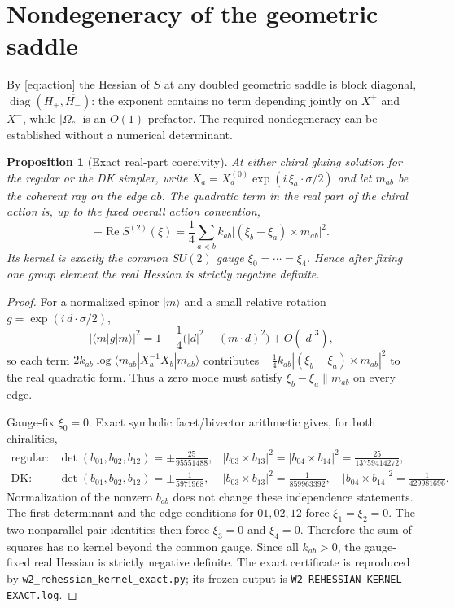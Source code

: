 \documentclass[11pt]{article}
\numberwithin{equation}{section}
\newtheorem{proposition}[theorem]{Proposition}
\theoremstyle{definition}
\theoremstyle{remark}
\newcommand{\SUtwo}{SU(2)}
\renewcommand{\Re}{\operatorname{Re}}
\begin{document}
\section{Nondegeneracy of the geometric saddle}\label{sec:s4}

By \eqref{eq:action} the Hessian of $S$ at any doubled geometric saddle is
block diagonal,
$\operatorname{diag}(H_+,\overline{H_-})$: the exponent contains no term
depending jointly on $X^+$ and $X^-$, while $|\Omega_c|$ is an $O(1)$
prefactor. The required nondegeneracy can be established without a numerical
determinant.

\begin{proposition}[Exact real-part coercivity]\label{prop:redef}
At either chiral gluing solution for the regular or the DK simplex, write
$X_a=X_a^{(0)}\exp(i\,\xi_a\!\cdot\!\sigma/2)$ and let $m_{ab}$ be the coherent
ray on the edge $ab$. The quadratic term in the real part of the chiral action
is, up to the fixed overall action convention,
\[
 -\Re S^{(2)}(\xi)
 =\frac14\sum_{a<b}k_{ab}
   \bigl|(\xi_b-\xi_a)\times m_{ab}\bigr|^2 .
\]
Its kernel is exactly the common $\SUtwo$ gauge
$\xi_0=\cdots=\xi_4$. Hence after fixing one group element the real Hessian is
strictly negative definite.
\end{proposition}

\begin{proof}
For a normalized spinor $|m\rangle$ and a small relative rotation
$g=\exp(i\,d\!\cdot\!\sigma/2)$,
\[
 |\langle m|g|m\rangle|^2
 =1-\frac14\bigl(|d|^2-(m\!\cdot d)^2\bigr)+O(|d|^3),
\]
so each term $2k_{ab}\log\langle m_{ab}|X_a^{-1}X_b|m_{ab}\rangle$
contributes
$-\tfrac14 k_{ab}|(\xi_b-\xi_a)\times m_{ab}|^2$ to the real quadratic
form. Thus a zero mode must satisfy
$\xi_b-\xi_a\parallel m_{ab}$ on every edge.

Gauge-fix $\xi_0=0$. Exact symbolic facet/bivector arithmetic gives, for both
chiralities,
\[
\begin{array}{lll}
\text{regular:}&
 \det(b_{01},b_{02},b_{12})=\pm\frac{25}{95551488},&
 |b_{03}\!\times b_{13}|^2=|b_{04}\!\times b_{14}|^2
 =\frac{25}{13759414272},\\[3pt]
\text{DK:}&
 \det(b_{01},b_{02},b_{12})=\pm\frac{1}{5971968},&
 |b_{03}\!\times b_{13}|^2=\frac{1}{859963392},\quad
 |b_{04}\!\times b_{14}|^2=\frac{1}{429981696}.
\end{array}
\]
Normalization of the nonzero $b_{ab}$ does not change these independence
statements. The first determinant and the edge conditions for $01,02,12$
force $\xi_1=\xi_2=0$. The two nonparallel-pair identities then force
$\xi_3=0$ and $\xi_4=0$. Therefore the sum of squares has no kernel beyond
the common gauge. Since all $k_{ab}>0$, the gauge-fixed real Hessian is
strictly negative definite. The exact certificate is reproduced by
\texttt{w2\_rehessian\_kernel\_exact.py}; its frozen output is
\texttt{W2-REHESSIAN-KERNEL-EXACT.log}.
\end{proof}
\end{document}
